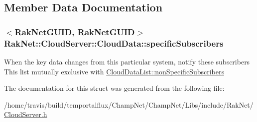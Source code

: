 \subsection{Member Data Documentation}
\hypertarget{struct_rak_net_1_1_cloud_server_1_1_cloud_data_a20639e17af5333fa9a88f2e887a0537b}{
\subsubsection[{specific\-Subscribers}]{$<${\bf Rak\-Net\-G\-U\-I\-D}, {\bf Rak\-Net\-G\-U\-I\-D}$>$ Rak\-Net\-::\-Cloud\-Server\-::\-Cloud\-Data\-::specific\-Subscribers}}\label{struct_rak_net_1_1_cloud_server_1_1_cloud_data_a20639e17af5333fa9a88f2e887a0537b}
When the key data changes from this particular system, notify these subscribers This list mutually exclusive with \hyperlink{struct_rak_net_1_1_cloud_server_1_1_cloud_data_list_a04e1a204973c5df1d56d17f5d99f36ea}{Cloud\-Data\-List\-::non\-Specific\-Subscribers} 

The documentation for this struct was generated from the following file\-:\begin{DoxyCompactItemize}
\item 
/home/travis/build/temportalflux/\-Champ\-Net/\-Champ\-Net/\-Libs/include/\-Rak\-Net/\hyperlink{_cloud_server_8h}{Cloud\-Server.\-h}\end{DoxyCompactItemize}
